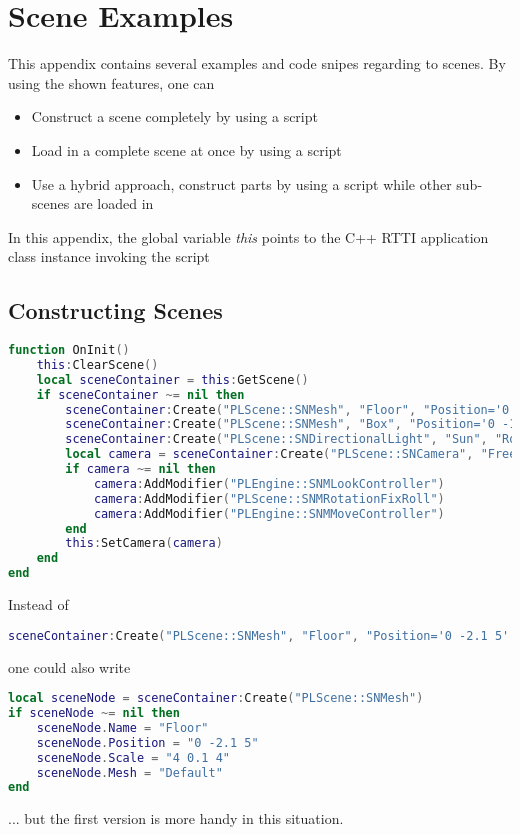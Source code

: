 \chapter{Scene Examples}
\label{Appendix:SceneExamples}
This appendix contains several examples and code snipes regarding to scenes. By using the shown features, one can
\begin{itemize}
\item{Construct a scene completely by using a script}
\item{Load in a complete scene at once by using a script}
\item{Use a hybrid approach, construct parts by using a script while other sub-scenes are loaded in}
\end{itemize}
In this appendix, the global variable \emph{this} points to the C++ \ac{RTTI} application class instance invoking the script 




\section{Constructing Scenes}
\begin{lstlisting}[language=lua]
function OnInit()
	this:ClearScene()
	local sceneContainer = this:GetScene()
	if sceneContainer ~= nil then
		sceneContainer:Create("PLScene::SNMesh", "Floor", "Position='0 -2.1 5' Scale='4 0.1 4' Rotation='0 180 0' Mesh='Default'")
		sceneContainer:Create("PLScene::SNMesh", "Box", "Position='0 -1.5 5' Scale='0.5 0.5 0.5' Mesh='Default'")
		sceneContainer:Create("PLScene::SNDirectionalLight", "Sun", "Rotation='45 0 0'")
		local camera = sceneContainer:Create("PLScene::SNCamera", "FreeCamera")
		if camera ~= nil then
			camera:AddModifier("PLEngine::SNMLookController")
			camera:AddModifier("PLScene::SNMRotationFixRoll")
			camera:AddModifier("PLEngine::SNMMoveController")
		end
		this:SetCamera(camera)
	end
end
\end{lstlisting}

Instead of
\begin{lstlisting}[language=lua]
sceneContainer:Create("PLScene::SNMesh", "Floor", "Position='0 -2.1 5' Scale='4 0.1 4' Rotation='0 180 0' Mesh='Default'")
\end{lstlisting}
one could also write
\begin{lstlisting}[language=lua]
local sceneNode = sceneContainer:Create("PLScene::SNMesh")
if sceneNode ~= nil then
	sceneNode.Name = "Floor"
	sceneNode.Position = "0 -2.1 5"
	sceneNode.Scale = "4 0.1 4"
	sceneNode.Mesh = "Default"
end
\end{lstlisting}
... but the first version is more handy in this situation.

